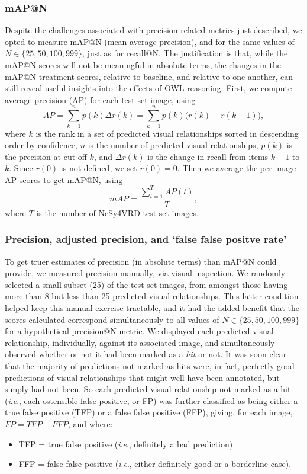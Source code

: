\documentclass[]{jair}
\newcommand{\ie}{\textit{i}.\textit{e}.,\xspace}
\begin{document}
\subsubsection{mAP@N}
Despite the challenges associated with precision-related metrics just described, we opted to measure mAP@N (mean average precision), and for the same values of $N \in \{25, 50, 100, 999\}$, just as for recall@N.
The justification is that, while the mAP@N scores will not be meaningful in absolute terms, the changes in the mAP@N treatment scores, relative to baseline, and relative to one another, can still reveal useful insights into the effects of OWL reasoning.
First, we compute average precision (AP) for each test set image, using
\begin{displaymath}
  AP = \sum_{k=1}^n p(k) \Delta r(k) = \sum_{k=1}^n p(k) \Big(r(k) - r(k-1)\Big),
\end{displaymath}
where $k$ is the rank in a set of predicted visual relationships sorted in descending order by confidence, $n$ is the number of predicted visual relationships, $p(k)$ is the precision at cut-off $k$, and $\Delta r(k)$ is the change in recall from items $k-1$ to $k$.
Since $r(0)$ is not defined, we set $r(0) = 0$.
Then we average the per-image AP scores to get mAP@N, using
\begin{displaymath}
  mAP = \frac{\sum_{t=1}^T AP(t)}{T},
\end{displaymath}
where $T$ is the number of NeSy4VRD test set images.

\subsubsection{Precision, adjusted precision, and `false false positve rate'}
To get truer estimates of precision (in absolute terms) than mAP@N could provide, we measured precision manually, via visual inspection.
We randomly selected a small subset (25) of the test set images, from amongst those having more than 8 but less than 25 predicted visual relationships.
This latter condition helped keep this manual exercise tractable, and it had the added benefit that the scores calculated correspond simultaneously to all values of $N \in \{25, 50, 100, 999\}$ for a hypothetical precision@N metric.
We displayed each predicted visual relationship, individually, against its associated image, and simultaneously observed whether or not it had been marked as a \emph{hit} or not.
It was soon clear that the majority of predictions not marked as hits were, in fact, perfectly good predictions of visual relationships that might well have been annotated, but simply had not been.
So each predicted visual relationship not marked as a hit (\ie each ostensible false positive, or FP) was further classified as being either a true false positive (TFP) or a false false positive (FFP), giving, for each image, $FP = TFP + FFP$, and where: 
\begin{itemize}
  \item TFP = true false positive (\ie definitely a bad prediction)
  \item FFP = false false positive (\ie either definitely good or a borderline case).
\end{itemize}
\end{document}
